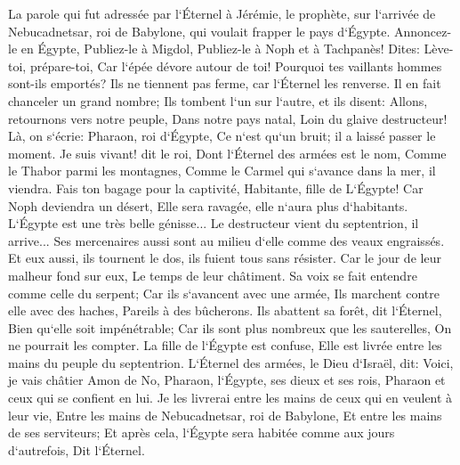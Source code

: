 \verse La parole qui fut adressée par l`Éternel à Jérémie, le prophète, sur l`arrivée de Nebucadnetsar, roi de Babylone, qui voulait frapper le pays d`Égypte. 
\verse Annoncez-le en Égypte, Publiez-le à Migdol, Publiez-le à Noph et à Tachpanès! Dites: Lève-toi, prépare-toi, Car l`épée dévore autour de toi! 
\verse Pourquoi tes vaillants hommes sont-ils emportés? Ils ne tiennent pas ferme, car l`Éternel les renverse. 
\verse Il en fait chanceler un grand nombre; Ils tombent l`un sur l`autre, et ils disent: Allons, retournons vers notre peuple, Dans notre pays natal, Loin du glaive destructeur! 
\verse Là, on s`écrie: Pharaon, roi d`Égypte, Ce n`est qu`un bruit; il a laissé passer le moment. 
\verse Je suis vivant! dit le roi, Dont l`Éternel des armées est le nom, Comme le Thabor parmi les montagnes, Comme le Carmel qui s`avance dans la mer, il viendra. 
\verse Fais ton bagage pour la captivité, Habitante, fille de L`Égypte! Car Noph deviendra un désert, Elle sera ravagée, elle n`aura plus d`habitants. 
\verse L`Égypte est une très belle génisse... Le destructeur vient du septentrion, il arrive... 
\verse Ses mercenaires aussi sont au milieu d`elle comme des veaux engraissés. Et eux aussi, ils tournent le dos, ils fuient tous sans résister. Car le jour de leur malheur fond sur eux, Le temps de leur châtiment. 
\verse Sa voix se fait entendre comme celle du serpent; Car ils s`avancent avec une armée, Ils marchent contre elle avec des haches, Pareils à des bûcherons. 
\verse Ils abattent sa forêt, dit l`Éternel, Bien qu`elle soit impénétrable; Car ils sont plus nombreux que les sauterelles, On ne pourrait les compter. 
\verse La fille de l`Égypte est confuse, Elle est livrée entre les mains du peuple du septentrion. 
\verse L`Éternel des armées, le Dieu d`Israël, dit: Voici, je vais châtier Amon de No, Pharaon, l`Égypte, ses dieux et ses rois, Pharaon et ceux qui se confient en lui. 
\verse Je les livrerai entre les mains de ceux qui en veulent à leur vie, Entre les mains de Nebucadnetsar, roi de Babylone, Et entre les mains de ses serviteurs; Et après cela, l`Égypte sera habitée comme aux jours d`autrefois, Dit l`Éternel. 
